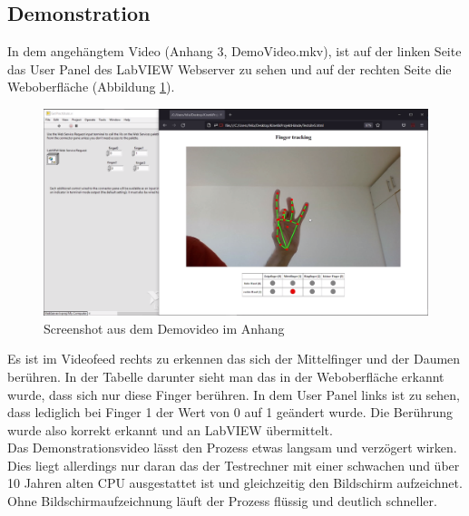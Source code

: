 \documentclass[a4paper,12pt,final]{article} %
\numberwithin{equation}{section} %
\numberwithin{figure}{section} %
\numberwithin{table}{section} %
\begin{document}
\subsection{Demonstration}
In dem angehängtem Video (Anhang 3, DemoVideo.mkv), ist auf der linken Seite das User Panel des LabVIEW Webserver zu sehen und auf der rechten Seite die Web\-ober\-fläche (Abbildung \ref{fig:ScreenshotVideo}).
\begin{figure}[H]
	\begin{center}
		\includegraphics[width=12cm]{Bilder/ScreenshotVideo.png}
		\caption{Screenshot aus dem Demovideo im Anhang}
		\label{fig:ScreenshotVideo}
	\end{center}
\end{figure}
Es ist im Videofeed rechts zu erkennen das sich der Mittelfinger und der Daumen berühren. In der Tabelle darunter sieht man das in der Weboberfläche erkannt wurde, dass sich nur diese Finger berühren.
In dem User Panel links ist zu sehen, dass lediglich bei Finger 1 der Wert von 0 auf 1 geändert wurde. Die Berührung wurde also korrekt erkannt und an LabVIEW übermittelt.\\
Das Demonstrationsvideo lässt den Prozess etwas langsam und verzögert wirken. Dies liegt allerdings nur daran das der Testrechner mit einer schwachen und über 10 Jahren alten CPU ausgestattet ist und gleichzeitig den Bildschirm aufzeichnet. 
Ohne Bild\-schirm\-auf\-zeich\-nung läuft der Prozess flüssig und deutlich schneller. 
\newpage
\end{document}
